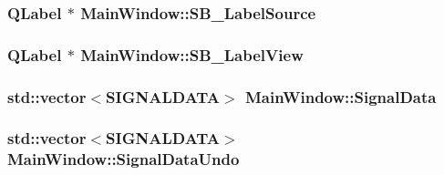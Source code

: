 \hypertarget{class_main_window_26661d9f5672bd4b5b27b9a9b3aa2ff3}{
\subsubsection[{SB\_\-LabelSource}]{\setlength{\rightskip}{0pt plus 5cm}QLabel $\ast$ {\bf MainWindow::SB\_\-LabelSource}}}
\label{class_main_window_26661d9f5672bd4b5b27b9a9b3aa2ff3}


\hypertarget{class_main_window_ef28f019ed8b77976e523d0a100eb0fe}{
\subsubsection[{SB\_\-LabelView}]{\setlength{\rightskip}{0pt plus 5cm}QLabel $\ast$ {\bf MainWindow::SB\_\-LabelView}}}
\label{class_main_window_ef28f019ed8b77976e523d0a100eb0fe}


\hypertarget{class_main_window_efbc5f06514ef2f41b887afed5502561}{
\subsubsection[{SignalData}]{\setlength{\rightskip}{0pt plus 5cm}std::vector$<${\bf SIGNALDATA}$>$ {\bf MainWindow::SignalData}}}
\label{class_main_window_efbc5f06514ef2f41b887afed5502561}


\hypertarget{class_main_window_9bb84329eb6036edb4c1aeadb20dd328}{
\subsubsection[{SignalDataUndo}]{\setlength{\rightskip}{0pt plus 5cm}std::vector$<${\bf SIGNALDATA}$>$ {\bf MainWindow::SignalDataUndo}}}
\label{class_main_window_9bb84329eb6036edb4c1aeadb20dd328}


